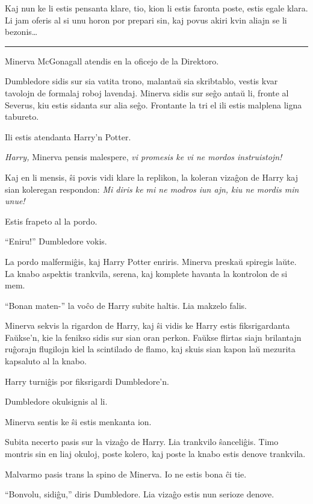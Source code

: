 Kaj nun ke li estis pensanta klare, tio, kion li estis faronta poste,
estis egale klara. Li jam oferis al si unu horon por prepari sin, kaj
povus akiri kvin aliajn se li bezonis\ldots

\begin{center}\rule{3in}{0.4pt}\end{center}

Minerva McGonagall atendis en la oficejo de la Direktoro.

Dumbledore sidis sur sia vatita trono, malantaŭ sia skribtablo, vestis
kvar tavolojn de formalaj roboj lavendaj. Minerva sidis sur seĝo antaŭ
li, fronte al Severus, kiu estis sidanta sur alia seĝo. Frontante la
tri el ili estis malplena ligna tabureto.

Ili estis atendanta Harry'n Potter.

\emph{Harry,} Minerva pensis malespere, \emph{vi promesis ke vi ne mordos instruistojn!}

Kaj en li mensis, ŝi povis vidi klare la replikon, la koleran vizaĝon
de Harry kaj sian koleregan respondon: \emph{Mi diris ke mi ne modros
  iun ajn, kiu ne mordis min unue!}

Estis frapeto al la pordo.

``Eniru!'' Dumbledore vokis.

La pordo malfermiĝis, kaj Harry Potter enriris. Minerva preskaŭ
spiregis laŭte. La knabo aspektis trankvila, serena, kaj komplete
havanta la kontrolon de si mem.

``Bonan maten-'' la voĉo de Harry subite haltis. Lia makzelo falis.

Minerva sekvis la rigardon de Harry, kaj ŝi vidis ke Harry estis
fiksrigardanta Faŭkse'n, kie la fenikso sidis sur sian oran
perkon. Faŭkse flirtas siajn brilantajn ruĝorajn flugilojn kiel la
scintilado de flamo, kaj skuis sian kapon laŭ mezurita kapsaluto al
la knabo.

Harry turniĝis por fiksrigardi Dumbledore'n.

Dumbledore okulsignis al li.

Minerva sentis ke ŝi estis menkanta ion.

Subita necerto pasis sur la vizaĝo de Harry. Lia trankvilo
ŝanceliĝis. Timo montris sin en liaj okuloj, poste kolero, kaj poste
la knabo estis denove trankvila.

Malvarmo pasis trans la spino de Minerva. Io ne estis bona ĉi tie.

``Bonvolu, sidiĝu,'' diris Dumbledore. Lia vizaĝo estis nun serioze denove.

